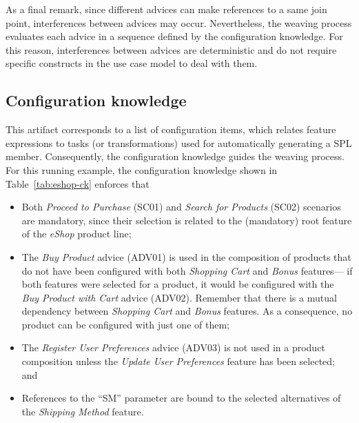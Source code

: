 \documentclass{sig-alt-full}
\begin{document}
 As a final remark,
since different advices can make references to a same join point,  interferences
between advices may occur. Nevertheless, the weaving process evaluates each advice in
a sequence defined by the configuration knowledge. For this reason, interferences
between advices are deterministic and do not require specific constructs in the
use case model to deal with them.

\subsection{Configuration knowledge}\label{sub:configuration-knowledge}

This artifact corresponds to a list of configuration items, which
relates feature expressions to tasks (or transformations) used for automatically generating a
SPL member. Consequently, the configuration knowledge guides the weaving
process. For this running example, the configuration knowledge shown in
Table~\ref{tab:eshop-ck} enforces that

\begin{itemize}
\item Both \emph{Proceed to Purchase} (SC01) and \emph{Search for Products}
(SC02) scenarios are mandatory, since their selection is related to the
(mandatory) root feature of the \emph{eShop} product line;

\item The \emph{Buy Product} advice (ADV01) is used in the composition of
products that do not have been configured with both \emph{Shopping Cart} and \emph{Bonus}
features--- if both features were selected for a product, it would be configured
with the \emph{Buy Product with Cart} advice (ADV02). Remember that there is a
mutual dependency between \emph{Shopping Cart} and \emph{Bonus} features. As a
consequence, no product can be configured with just one of them;

\item The \emph{Register User Preferences} advice (ADV03) is not used in a
product composition unless the \emph{Update User Preferences} feature has been
selected; and

\item References to the ``SM'' parameter are bound to the
selected alternatives of the \emph{Shipping Method} feature.

\end{itemize}
\end{document}
